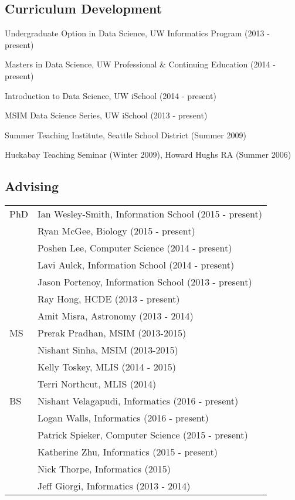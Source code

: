 \documentclass[11pt]{article}
\renewenvironment{itemize}{
  \begin{list}{}{
    \setlength{\leftmargin}{1.5em}
  }
}{
  \end{list}
}
\begin{document}
\subsection*{Curriculum Development}
\begin{itemize}
\item Undergraduate Option in Data Science, UW Informatics Program (2013 - present) 
\item Masters in Data Science, UW Professional \& Continuing Education (2014 - present)
\item Introduction to Data Science, UW iSchool (2014 - present)
\item MSIM Data Science Series, UW iSchool (2013 - present)
\item Summer Teaching Institute, Seattle School District (Summer 2009)
\item Huckabay Teaching Seminar (Winter 2009), Howard Hughs RA (Summer 2006)
\end{itemize}

\subsection*{Advising}
\setlength{\extrarowheight}{3pt}
\begin{longtable}{p{0.5in}|p{5.5in}}
  PhD   & Ian Wesley-Smith, Information School (2015 - present) \\
        & Ryan McGee, Biology (2015 - present) \\
        & Poshen Lee, Computer Science (2014 - present) \\
        & Lavi Aulck, Information School (2014 - present) \\
        & Jason Portenoy, Information School (2013 - present) \\
        & Ray Hong, HCDE (2013 - present) \\
        & Amit Misra, Astronomy (2013 - 2014) \\
  MS    & Prerak Pradhan, MSIM (2013-2015) \\
        & Nishant Sinha, MSIM (2013-2015) \\
        & Kelly Toskey, MLIS (2014 - 2015) \\	
        & Terri Northcut, MLIS (2014) \\
  BS    & Nishant Velagapudi, Informatics (2016 - present) \\
        & Logan Walls, Informatics (2016 - present) \\
        & Patrick Spieker, Computer Science (2015 - present) \\
        & Katherine Zhu, Informatics (2015 - present) \\
        & Nick Thorpe, Informatics (2015) \\
        & Jeff Giorgi, Informatics (2013 - 2014) \\
\end{longtable}
\end{document}
